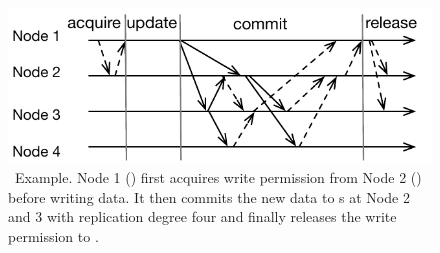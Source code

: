 {
\begin{figure}[t]
\begin{center}
\centerline{\includegraphics[width=\textwidth]{hotpot/Figures/mrsw.pdf}}
\caption[\mrsw\ Example.]
{
\mrsw\ Example.
Node 1 (\xn) first acquires write permission from Node 2 (\master)
before writing data.
It then commits the new data to \on{}s at Node 2 and 3 with replication degree four
and finally releases the write permission to \master.
}
\label{fig-mrsw}
\end{center}
\end{figure}
}
